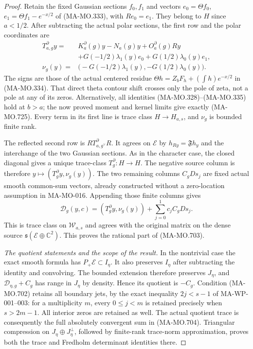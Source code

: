 \begin{proof}
Retain the fixed Gaussian sections \(f_0,f_1\)
and vectors \(e_0=\Theta f_0\),
\(e_1=\Theta f_1-e^{-x/2}\) of
(MA-MO.333), with \(Re_0=e_1\).
They belong to \(H\) since \(a<1/2\).
After subtracting the actual polar sections,
the first row and the polar coordinates are
\[
 \begin{aligned}
 T_{a,g}^{\partial}y
   ={}&K_a^{\partial}(g)y-N_a(g)y
                                 +O_a^{\partial}(g)Ry\\
      &+G(-1/2)\lambda_1(y)e_0
                     +G(1/2)\lambda_0(y)e_1,\\
 \nu_g(y)
   ={}&\bigl(-G(-1/2)\lambda_1(y),
                         -G(1/2)\lambda_0(y)\bigr).
 \end{aligned}
 \tag{MA-MO.725}
\]
The signs are those of the actual centered residue
\(\Theta h=Z_bF_h+(\int h)e^{-x/2}\)
in (MA-MO.334). That direct theta contour
shift crosses only the pole of zeta, not a pole
at any of its zeros. Alternatively, all
identities (MA-MO.328)--(MA-MO.335) hold at
\(b>a\); the now proved moment and kernel
limits give exactly (MA-MO.725).
Every term in its first line is trace class
\(H\to H_{a,s}\), and \(\nu_g\) is bounded
finite rank.

The reflected second row is
\(RT_{a,g^\vee}^{\partial}R\).
It agrees on \(\mathcal E\) by
\(h_{Ry}=\mathfrak Fh_y\) and the interchange
of the two Gaussian sections. As in the
character case, the closed diagonal gives
a unique trace-class \(T_g^\partial:H\to H\).
The negative source column is therefore
\(y\mapsto(T_g^\partial y,\nu_g(y))\).
The two remaining columns \(C_gDs_j\) are
fixed actual smooth common-sum vectors,
already constructed without a zero-location
assumption in MA-MO-016. Appending those
finite columns gives
\[
 \mathscr D_g(y,c)
       =(T_g^\partial y,\nu_g(y))
                           +\sum_{j=0}^1c_jC_gDs_j .
 \tag{MA-MO.726}
\]
This is trace class on \(\mathcal W_{a,s}\)
and agrees with the original matrix on the
dense source \(\mathfrak s(\mathcal E\oplus\mathbb C^2)\).
This proves the rational part of (MA-MO.703).

\emph{The quotient statements and the scope of the result.}
In the nontrivial case the exact smooth formula
has \(P_+\mathcal E\subset I_\eta\).
It also preserves \(I_\eta\) after subtracting
the identity and convolving. The bounded
extension therefore preserves \(J_\eta\), and
\(\mathscr D_{\eta,g}+C_g\) has range in
\(J_\eta\) by density. Hence its quotient is
\(-C_g\). Condition (MA-MO.702) retains all
boundary jets, by the exact inequality
\(2j<s-1\) of MA-WP-001--003: for a
multiplicity \(m\), every \(0\le j<m\)
is retained precisely when \(s>2m-1\).
All interior zeros are retained as well.
The actual quotient trace is consequently
the full absolutely convergent sum in
(MA-MO.704). Triangular compression on
\(J_\eta\oplus J_\eta^\perp\), followed by
finite-rank trace-norm approximation, proves
both the trace and Fredholm determinant
identities there.


\end{proof}
